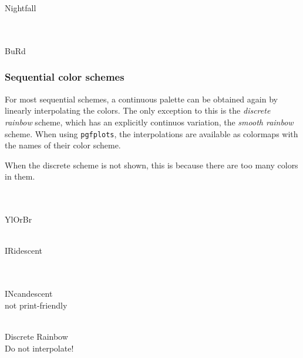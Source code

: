 \documentclass{scrartcl}
\begin{document}
\begin{center}
    \\
    \\
    Nightfall
\end{center}

\begin{center}
    \\
    \\
    BuRd
\end{center}\clearpage

\subsubsection{Sequential color schemes}\label{sec:T-S}
For most sequential schemes, a continuous palette can be obtained again by linearly interpolating the colors.
The only exception to this is the \emph{discrete rainbow} scheme, which has an explicitly continuos variation, the \emph{smooth rainbow} scheme.
When using \verb!pgfplots!, the interpolations are available as colormaps with the names of their color scheme.

When the discrete scheme is not shown, this is because there are too many colors in them.

\begin{center}
    \\
    \\
    YlOrBr
\end{center}

\begin{center}
    \\
    IRidescent
\end{center}

\begin{center}
    \\
    \\
    INcandescent\\
    not print-friendly
\end{center}

\begin{center}
    \\
    Discrete Rainbow\\
    Do not interpolate!
\end{center}
\end{document}
